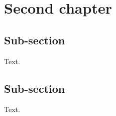 \chapter{Second chapter}
\label{second-chapter}

\section{Sub-section}
Text.

\section{Sub-section}
Text.



